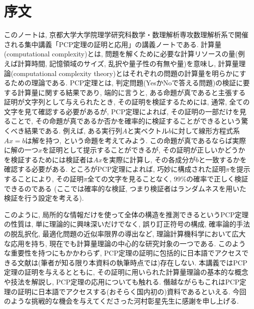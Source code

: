 \chapter*{序文}



このノートは, 京都大学大学院理学研究科数学・数理解析専攻数理解析系で開催される集中講義「PCP定理の証明と応用」の講義ノートである.
計算量(computational complexity)とは, 問題を解くために必要な計算リソースの量(例えば計算時間, 記憶領域のサイズ, 乱択や量子性の有無や量)を意味し, 計算量理論(computational complexity theory)とはそれぞれの問題の計算量を明らかにするための理論である.
PCP定理とは, 判定問題(YesかNoで答える問題)の検証に要する計算量に関する結果であり,
端的に言うと, ある命題が真であると主張する証明が文字列として与えられたとき,
その証明を検証するためには, 通常, 全ての文字を見て確認する必要があるが,
PCP定理によれば, その証明の一部だけを見ることで, その命題が真であるか否かを確率的に検証することができるという驚くべき結果である.
例えば, ある実行列$A$と実ベクトル$b$に対して線形方程式系$Ax=b$は解を持つ, という命題を考えてみよう.
この命題が真であるならば実際に解の一つ$x$を証明として提示することができるが, その証明が正しいかどうかを検証するためには検証者は$Ax$を実際に計算し, その各成分が$b$と一致するかを確認する必要がある.
ところがPCP定理によれば, 巧妙に構成された証明$\pi$を提示することにより, その証明$\pi$全ての文字を見ることなく, 99\%の確率で正しく検証できるのである (ここでは確率的な検証, つまり検証者はランダムネスを用いた検証を行う設定を考える).

このように, 局所的な情報だけを使って全体の構造を推測できるというPCP定理の性質は, 単に理論的に興味深いだけでなく, 誤り訂正符号の構成, 確率論的手法の脱乱択化, 最適化問題の近似率限界の導出など, 理論計算機科学において広大な応用を持ち, 現在でも計算量理論の中心的な研究対象の一つである.
このような重要性を持つにもかかわらず, PCP定理の証明に包括的に日本語でアクセスできる文献は(筆者が知る限り本資料の執筆時点では)存在しない.
本講義ではPCP定理の証明を与えるとともに, その証明に用いられた計算量理論の基本的な概念や技法を解説し,
PCP定理の応用についても触れる.
僭越ながらもこれはPCP定理の証明に日本語でアクセスする(おそらく国内初の)資料であるといえる.
今回のような挑戦的な機会を与えてくださった河村彰星先生に感謝を申し上げる.
